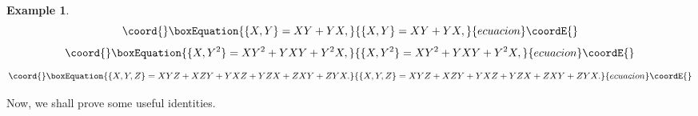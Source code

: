 \documentclass[a4paper,a4paper]{article}
\newtheorem{example}[theorem]{Example}
\begin{document}
\begin{example}
\begin{equation}\coord{}\boxEquation{
\{X,Y\}=XY+YX,  \label{ga8}
}{
\{X,Y\}=XY+YX,  }{ecuacion}\coordE{}\end{equation}%
\begin{equation}\coord{}\boxEquation{
\{X,Y^{2}\}=XY^{2}+YXY+Y^{2}X,  \label{ga9}
}{
\{X,Y^{2}\}=XY^{2}+YXY+Y^{2}X,  }{ecuacion}\coordE{}\end{equation}%
\begin{equation}\coord{}\boxEquation{
\{X,Y,Z\}=XYZ+XZY+YXZ+YZX+ZXY+ZYX.  \label{ga10}
}{
\{X,Y,Z\}=XYZ+XZY+YXZ+YZX+ZXY+ZYX.  }{ecuacion}\coordE{}\end{equation}
\end{example}

\noindent Now, we shall prove some useful identities.
\end{document}
